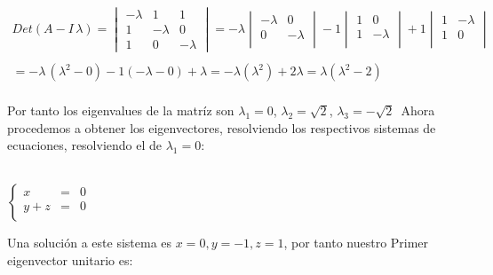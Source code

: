 \documentclass[11pt,letterpaper]{article}
\begin{document}
    \begin{align*}
        Det(A-I\,\lambda)=
            \begin{vmatrix}
                -\lambda & 1 & 1\\
                1 & -\lambda & 0\\
                1 & 0 & -\lambda
            \end{vmatrix}=-\lambda
            \begin{vmatrix}
                -\lambda & 0 \\
                0 & -\lambda \\
                \end{vmatrix}
                -1  
                \begin{vmatrix}
                1 & 0 \\
                1 & -\lambda \\
                \end{vmatrix}
                +1
                  \begin{vmatrix}
                1 & -\lambda \\
                1 & 0\\
                \end{vmatrix}\,\\
                \,\\
                =-\lambda\,(\lambda^2-0)-1(-\lambda-0)+\lambda
                =-\lambda(\lambda^2)+2\lambda=\lambda(\lambda^2-2)
    \end{align*}\,\\
    Por tanto los eigenvalues de la matr\'iz son $\lambda_1=0$, $\lambda_2=\sqrt{2}$, $\lambda_3=-\sqrt{2}$\,
    Ahora procedemos a obtener los eigenvectores, resolviendo los respectivos sistemas de ecuaciones, resolviendo
    el de $\lambda_1=0$:\,\\
    \,\\
    \begin{center}
     $\left\{ 
         \begin{array}{rcl}
            x&=&0\\
            y+z&=&0\\
         \end{array}
       \right.$\,\\
        \end{center}
    Una soluci\'on a este sistema es $x=0,y=-1,z=1$, por tanto nuestro Primer
    eigenvector unitario es:\,\\
    \,\\
\end{document}

